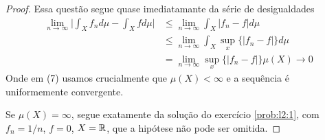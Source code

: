 \begin{problem}
    \label{prob:l2:4}
\end{problem}

\begin{proof}
    Essa questão segue quase imediatamante da série de desigualdades
    \begin{align}
        \lim_{n\to\infty} \bigg|\int_X f_n d\mu - \int_Xfd\mu \bigg| &\leq \lim_{n\to\infty} \int_X |f_n - f| d\mu\\
        &\leq \lim_{n\to\infty} \int_X \sup_x\{|f_n - f|\}d\mu\\
        &= \lim_{n\to\infty} \sup_x\{|f_n - f|\} \mu(X) \to 0
    \end{align}
    Onde em (7) usamos crucialmente que $\mu(X) < \infty$ e a sequência é uniformemente convergente.

    Se $\mu(X) = \infty$, segue exatamente da solução do exercício \ref{prob:l2:1}, com $f_n = 1/n$, $f = 0$, $X = \mathbb{R}$, que a hipótese não pode ser omitida.
\end{proof}

\begin{problem}
    \label{prob:l2:5}
\end{problem}

\begin{problem}
    \label{prob:l2:6}
\end{problem}

\begin{problem}
    \label{prob:l2:7}
\end{problem}